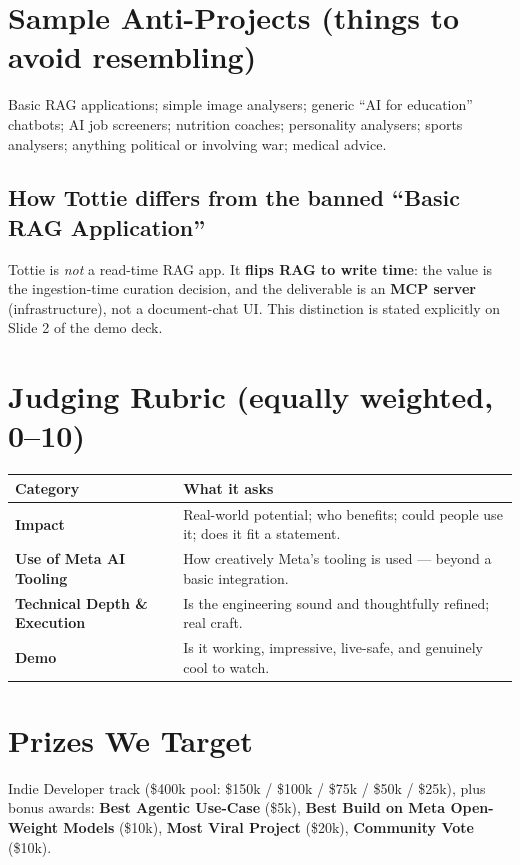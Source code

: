 \section{Sample Anti-Projects (things to avoid resembling)}
Basic RAG applications; simple image analysers; generic ``AI for education'' chatbots; AI job
screeners; nutrition coaches; personality analysers; sports analysers; anything political or
involving war; medical advice.

\subsection{How Tottie differs from the banned ``Basic RAG Application''}
Tottie is \emph{not} a read-time RAG app. It \textbf{flips RAG to write time}: the value is the
ingestion-time curation decision, and the deliverable is an \textbf{MCP server} (infrastructure),
not a document-chat UI. This distinction is stated explicitly on Slide 2 of the demo deck.

\section{Judging Rubric (equally weighted, 0--10)}
\begin{longtable}{@{}p{}p{}@{}}
\toprule
Category & What it asks \\
\midrule
\textbf{Impact} & Real-world potential; who benefits; could people use it; does it fit a statement. \\
\textbf{Use of Meta AI Tooling} & How creatively Meta's tooling is used --- beyond a basic integration. \\
\textbf{Technical Depth \& Execution} & Is the engineering sound and thoughtfully refined; real craft. \\
\textbf{Demo} & Is it working, impressive, live-safe, and genuinely cool to watch. \\
\bottomrule
\end{longtable}

\section{Prizes We Target}
Indie Developer track (\$400k pool: \$150k / \$100k / \$75k / \$50k / \$25k), plus bonus awards:
\textbf{Best Agentic Use-Case} (\$5k), \textbf{Best Build on Meta Open-Weight Models} (\$10k),
\textbf{Most Viral Project} (\$20k), \textbf{Community Vote} (\$10k).

